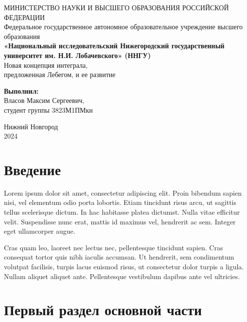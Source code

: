 \documentclass[a4paper,14pt]{extarticle}
\begin{document}
\begin{titlepage}
\begin{center}
МИНИСТЕРСТВО НАУКИ И ВЫСШЕГО ОБРАЗОВАНИЯ РОССИЙСКОЙ ФЕДЕРАЦИИ\\
Федеральное государственное автономное образовательное учреждение высшего образования\\
\textbf{«Национальный исследовательский Нижегородский государственный университет им. Н.И. Лобачевского» (ННГУ)}\\
\vspace*{\fill}
{\LARGE Новая концепция интеграла,\\предложенная Лебегом, и ее развитие}\\
\vspace{2cm}
\end{center}
\hfill
\begin{minipage}{0.4\textwidth}
\raggedright
\textbf{Выполнил:}\\
Власов Максим Сергеевич,\\
студент группы 3823М1ПМкн\\
\end{minipage}
\vspace*{\fill}
\begin{center}
Нижний Новгород\\
2024
\end{center}
\end{titlepage}

\newpage
\setcounter{page}{2}
\tableofcontents

\newpage
\section*{Введение}

Lorem ipsum dolor sit amet, consectetur adipiscing elit. Proin bibendum sapien nisi, vel elementum odio porta lobortis. Etiam tincidunt risus arcu, ut sagittis tellus scelerisque dictum. In hac habitasse platea dictumst. Nulla vitae efficitur velit. Suspendisse nunc erat, mattis id maximus vel, hendrerit ac sem. Integer eget ullamcorper augue.

Cras quam leo, laoreet nec lectus nec, pellentesque tincidunt sapien. Cras consequat tortor quis nibh iaculis accumsan. Ut hendrerit, sem condimentum volutpat facilisis, turpis lacus euismod risus, ut consectetur dolor turpis a ligula. Nullam aliquet aliquet ante. Pellentesque vestibulum dapibus ante vel ultricies.

\newpage
\section{Первый раздел основной части}
\end{document}
